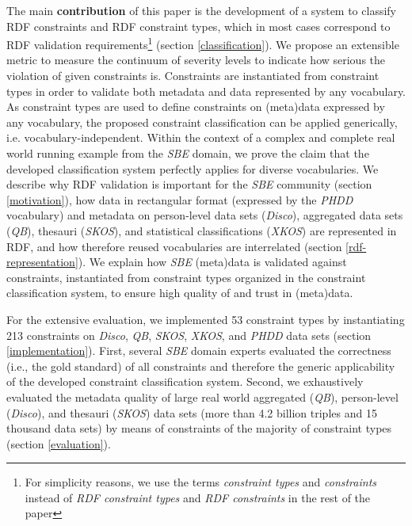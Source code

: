 \documentclass{llncs}
\begin{document}
The main \textbf{contribution} of this paper is the development of a system to classify RDF constraints and RDF constraint types, which in most cases correspond to RDF validation requirements\footnote{For simplicity reasons, we use the terms \emph{constraint types} and \emph{constraints} instead of \emph{RDF constraint types} and \emph{RDF constraints} in the rest of the paper} (section \ref{classification}).
We propose an extensible metric to measure the continuum of severity levels to indicate how serious the violation of given constraints is.
Constraints are instantiated from constraint types in order to validate both metadata and data represented by any vocabulary. 
As constraint types are used to define constraints on (meta)data expressed by any vocabulary, the proposed constraint classification can be applied generically, i.e. vocabulary-independent. 
Within the context of a complex and complete real world running example from the \emph{SBE} domain, we prove the claim that the developed classification system perfectly applies for diverse vocabularies.
We describe why RDF validation is important for the \emph{SBE} community (section \ref{motivation}), 
how data in rectangular format (expressed by the \emph{PHDD} vocabulary) and metadata on person-level data sets (\emph{Disco}), aggregated data sets (\emph{QB}), thesauri (\emph{SKOS}), and statistical classifications (\emph{XKOS}) are represented in RDF, and how therefore reused vocabularies are interrelated (section \ref{rdf-representation}).
We explain how \emph{SBE} (meta)data is validated against constraints, instantiated from constraint types organized in the constraint classification system, to ensure high quality of and trust in (meta)data.

For the extensive evaluation, we implemented 53 constraint types by instantiating 213 constraints on \emph{Disco}, \emph{QB}, \emph{SKOS}, \emph{XKOS}, and \emph{PHDD} data sets (section \ref{implementation}).
First, several \emph{SBE} domain experts evaluated the correctness (i.e., the gold standard) of all constraints and therefore the generic applicability of the developed constraint classification system. 
Second, we exhaustively evaluated the metadata quality of large real world aggregated (\emph{QB}), person-level (\emph{Disco}), and thesauri (\emph{SKOS}) data sets (more than 4.2 billion triples and 15 thousand data sets) by means of constraints of the majority of constraint types (section \ref{evaluation}).
\end{document}

